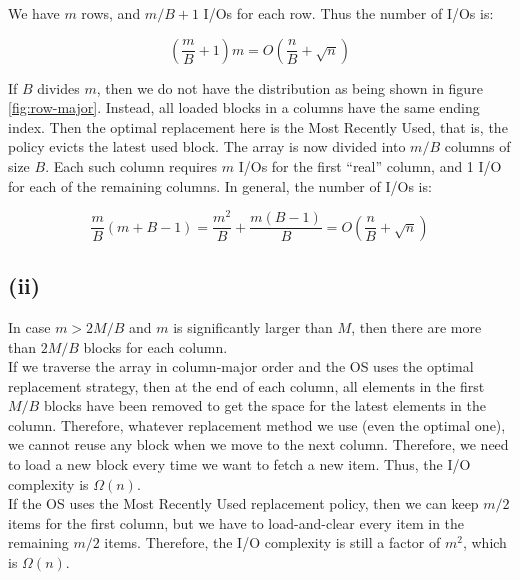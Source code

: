 We have $m$ rows, and $m/B + 1$ I/Os for each row. Thus the number of I/Os is:

 $$(\frac{m}{B} + 1)m = O(\frac{n}{B} + \sqrt{n})$$

If $B$ divides $m$, then we do not have the distribution as being shown in figure \ref{fig:row-major}. Instead, all loaded blocks in a columns have the same ending index. Then the optimal replacement here is the Most Recently Used, that is, the policy evicts the latest used block. The array is now divided into $m / B$ columns of size $B$. Each such column requires $m$ I/Os for the first ``real'' column, and 1 I/O for each of the remaining columns. In general, the number of I/Os is:

$$\frac{m}{B}(m + B - 1) = \frac{m^2}{B} + \frac{m(B - 1)}{B} = O(\frac{n}{B} + \sqrt{n})$$

\subsection*{(ii)}
In case $m > 2M/B$ and $m$ is significantly larger than $M$, then there are more than $2M/B$ blocks for each column.\\

If we traverse the array in column-major order and the OS uses the optimal replacement strategy, then at the end of each column, all elements in the first $M/B $ blocks have been removed to get the space for the latest elements in the column. Therefore, whatever replacement method we use (even the optimal one), we cannot reuse any block when we move to the next column. Therefore, we need to load a new block every time we want to fetch a new item. Thus, the I/O complexity is $\Omega(n)$.\\

If the OS uses the Most Recently Used replacement policy, then we can keep $m/2$ items for the first column, but we have to load-and-clear every item in the remaining $m/2$ items. Therefore, the I/O complexity is still a factor of $m^2$, which is $\Omega(n)$.
